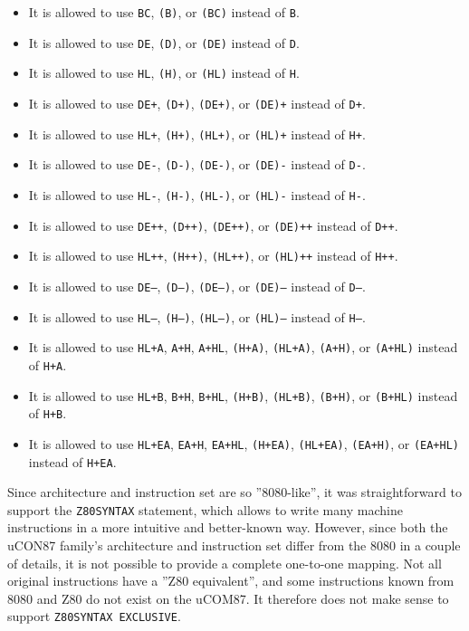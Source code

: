 \documentclass[12pt,twoside]{report}
\newcommand{\tty}[1]{{\tt #1}}
\begin{document}
\begin{itemize}
\item{It is allowed to use \tty{BC}, \tty{(B)}, or \tty{(BC)}
      instead of \tty{B}.}
\item{It is allowed to use \tty{DE}, \tty{(D)}, or \tty{(DE)}
      instead of \tty{D}.}
\item{It is allowed to use \tty{HL}, \tty{(H)}, or \tty{(HL)}
      instead of \tty{H}.}
\item{It is allowed to use \tty{DE+}, \tty{(D+)}, \tty{(DE+)},
      or \tty{(DE)+} instead of \tty{D+}.}
\item{It is allowed to use \tty{HL+}, \tty{(H+)}, \tty{(HL+)},
      or \tty{(HL)+} instead of \tty{H+}.}
\item{It is allowed to use \tty{DE-}, \tty{(D-)}, \tty{(DE-)},
      or \tty{(DE)-} instead of \tty{D-}.}
\item{It is allowed to use \tty{HL-}, \tty{(H-)}, \tty{(HL-)},
      or \tty{(HL)-} instead of \tty{H-}.}
\item{It is allowed to use \tty{DE++}, \tty{(D++)}, \tty{(DE++)},
      or \tty{(DE)++} instead of \tty{D++}.}
\item{It is allowed to use \tty{HL++}, \tty{(H++)}, \tty{(HL++)},
      or \tty{(HL)++} instead of \tty{H++}.}
\item{It is allowed to use \tty{DE--}, \tty{(D--)}, \tty{(DE--)},
      or \tty{(DE)--} instead of \tty{D--}.}
\item{It is allowed to use \tty{HL--}, \tty{(H--)}, \tty{(HL--)},
      or \tty{(HL)--} instead of \tty{H--}.}
\item{It is allowed to use \tty{HL+A}, \tty{A+H}, \tty{A+HL},
      \tty{(H+A)}, \tty{(HL+A)}, \tty{(A+H)}, or \tty{(A+HL)}
      instead of \tty{H+A}.}
\item{It is allowed to use \tty{HL+B}, \tty{B+H}, \tty{B+HL},
      \tty{(H+B)}, \tty{(HL+B)}, \tty{(B+H)}, or \tty{(B+HL)}
      instead of \tty{H+B}.}
\item{It is allowed to use \tty{HL+EA}, \tty{EA+H}, \tty{EA+HL},
      \tty{(H+EA)}, \tty{(HL+EA)}, \tty{(EA+H)}, or \tty{(EA+HL)}
      instead of \tty{H+EA}.}
\end{itemize}

Since architecture and instruction set are so ''8080-like'', it was
straightforward to support the {\tt Z80SYNTAX} statement, which
allows to write many machine instructions in a more intuitive and
better-known way.  However, since both the uCON87 family's architecture
and instruction set differ from the 8080 in a couple of details, it
is not possible to provide a complete one-to-one mapping.  Not all
original instructions have a ''Z80 equivalent'', and some instructions
known from 8080 and Z80 do not exist on the uCOM87.  It therefore
does not make sense to support {\tt Z80SYNTAX EXCLUSIVE}.
\end{document}
